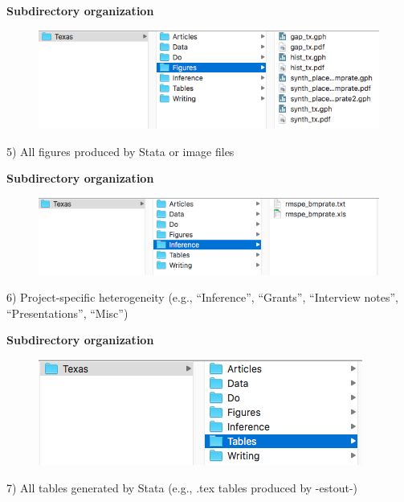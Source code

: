 \documentclass[notes=show]{beamer}
\begin{document}
\begin{frame}[plain]
\begin{center}
\textbf{Subdirectory organization}
\end{center}

\begin{figure}
\includegraphics[scale=0.5]{./lecture_includes/figures.png}
\end{figure}

5) All figures produced by Stata or image files
\end{frame}


\begin{frame}[plain]
\begin{center}
\textbf{Subdirectory organization}
\end{center}

\begin{figure}
\includegraphics[scale=0.5]{./lecture_includes/misc.png}
\end{figure}

6) Project-specific heterogeneity (e.g., ``Inference'', ``Grants'', ``Interview notes'', ``Presentations'', ``Misc'') 
\end{frame}

\begin{frame}[plain]
\begin{center}
\textbf{Subdirectory organization}
\end{center}

\begin{figure}
\includegraphics[scale=0.5]{./lecture_includes/tables.png}
\end{figure}

7) All tables generated by Stata (e.g., .tex tables produced by -estout-)
\end{frame}
\end{document}
